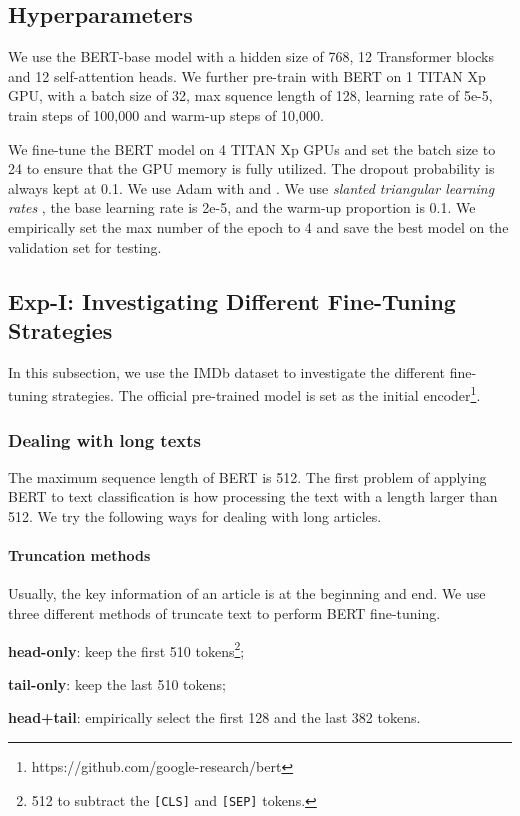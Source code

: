 \documentclass[11pt,a4paper]{article}
\theoremstyle{definition}
\begin{document}
\begin{CJK*}{UTF8}{gbsn}
	\subsection{Hyperparameters}
	We use the BERT-base model \cite{devlin2018bert} with a hidden size of 768, 12 Transformer blocks \cite{vaswani2017attention} and 12 self-attention heads. We further pre-train with BERT on 1 TITAN Xp GPU, with a batch size of 32, max squence length of 128, learning rate of 5e-5, train steps of 100,000 and warm-up steps of 10,000.
	
	We fine-tune the BERT model on 4 TITAN Xp GPUs and set the batch size to 24 to ensure that the GPU memory is fully utilized. The dropout probability is always kept at 0.1. We use Adam with  and . We use \textit{slanted triangular learning rates} \cite{howard2018universal}, the base learning rate is 2e-5, and the warm-up proportion is 0.1. We empirically set the max number of the epoch to 4 and save the best model on the validation set for testing.

\subsection{Exp-I: Investigating Different Fine-Tuning Strategies} \label{sec:exp-fit}

In this subsection, we use the IMDb dataset to investigate the different fine-tuning strategies. The official pre-trained model is set as the initial encoder\footnote{https://github.com/google-research/bert}.


\subsubsection{Dealing with long texts}

The maximum sequence length of BERT is 512. The first problem of applying BERT to text classification is how processing the text with a length larger than 512. We try the following ways for dealing with long articles.

\paragraph{Truncation methods}
Usually, the key information of an article is at the beginning and end. We use three different methods of truncate text to perform BERT fine-tuning.
\begin{enumerate**}
	\item \textbf{head-only}: keep the first 510 tokens\footnote{512 to subtract the \texttt{[CLS]} and \texttt{[SEP]} tokens.};
	\item \textbf{tail-only}: keep the last 510 tokens;
	\item \textbf{head+tail}: empirically select the first 128 and the last 382 tokens.
\end{enumerate**}


\end{CJK*}
\end{document}
